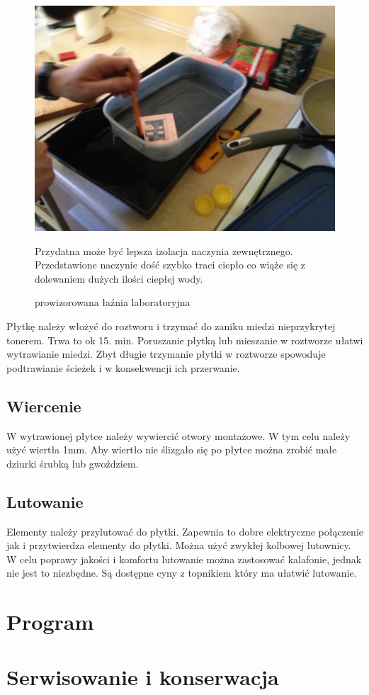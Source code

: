 \documentclass[a4paper,11pt]{article}
\def\SCALE{0.6}
\begin{document}
\begin{figure}[H]
	\centering
	\includegraphics[width=\SCALE
	\paperwidth]{wanienka}
	\caption{prowizorowana łaźnia laboratoryjna}
Przydatna może być lepsza izolacja naczynia zewnętrznego. Przedstawione naczynie dość szybko traci ciepło co wiąże się z dolewaniem dużych ilości ciepłej wody.
\end{figure}


Płytkę należy włożyć do roztworu i trzymać do zaniku miedzi nieprzykrytej tonerem. Trwa to ok 15. min. Poruszanie płytką lub mieszanie w roztworze ułatwi wytrawianie miedzi. Zbyt długie trzymanie płytki w roztworze spowoduje podtrawianie ścieżek i w konsekwencji ich przerwanie.

\subsection{Wiercenie}
W wytrawionej płytce należy wywiercić otwory montażowe. W tym celu należy użyć wiertła 1mm. Aby wiertło nie ślizgało się po płytce można zrobić małe dziurki śrubką lub gwoździem.

\subsection{Lutowanie}
Elementy należy przylutować do płytki. Zapewnia to dobre elektryczne połączenie jak i przytwierdza elementy do płytki. Można użyć zwykłej kolbowej lutownicy. W celu poprawy jakości i komfortu lutowanie można zastosować kalafonie, jednak nie jest to niezbędne. Są dostępne cyny z topnikiem który ma ułatwić lutowanie.

\section{Program}
\section{Serwisowanie i konserwacja}
\end{document}
